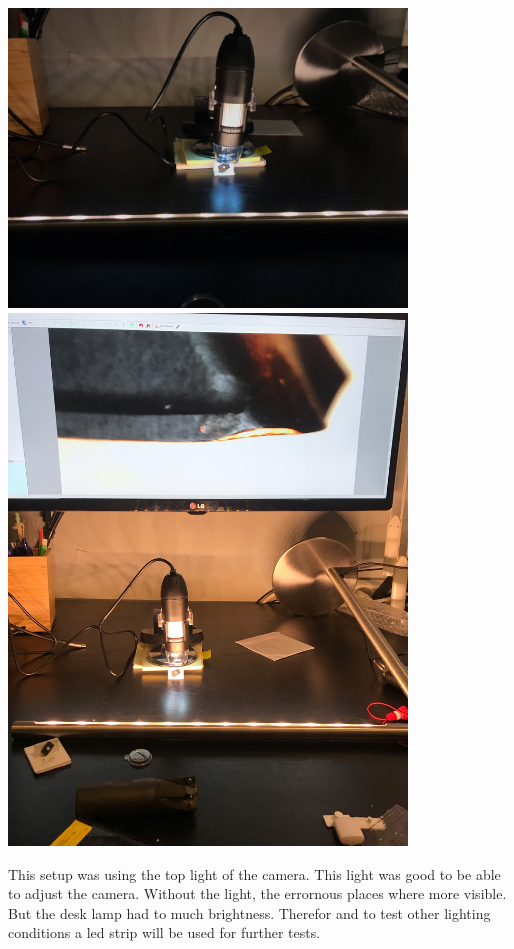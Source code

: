 \documentclass{article}
\begin{document}
\includegraphics[width=4.166667in, keepaspectratio=true]{./ZimFiles_files/Camera_setup/Light/Desk_Lamp_Test/eerste_setup_andere_richting.jpeg}\includegraphics[width=4.166667in, keepaspectratio=true]{./ZimFiles_files/Camera_setup/Light/Desk_Lamp_Test/eerste_setup_andere_richting_beeld2.jpeg}



This setup was using the top light of the camera. This light was good to be able to adjust the camera. Without the light, the errornous places where more visible. But the desk lamp had to much brightness. Therefor and to test other lighting conditions a led strip will be used for further tests. 
\end{document}

